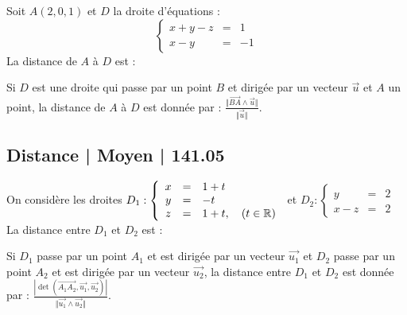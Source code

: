 \begin{question}
Soit $A(2,0,1)$ et $D$ la droite d'équations :
$$\left\{\begin{array}{ccl}x+y-z&=&1\\x-y&=&-1 \end{array}\right.$$
  La distance de $A$ à $D$ est : 
\begin{answers}


 
   
   
\end{answers}
\begin{explanations}
Si $D$ est une droite qui passe par un point $B$ et dirigée par un vecteur $\vec{u}$  et $A$ un point, la distance de $A$ à $D$ est donnée par : $\frac{ \Vert \overrightarrow{BA} \wedge \vec{u} \Vert}{\Vert \vec{u}  \Vert}$.
\end{explanations}

\end{question}

\subsection{Distance | Moyen | 141.05}


\begin{question} 
     
On considère les droites $D_1 : \left\{\begin{array}{ccl}x&=&1+t\\y&=&-t\\ z&=&1+t,\quad (t \in \mathbb{R})  \end{array}\right.$ et 
$D_2 : \left\{\begin{array}{ccl}y&=&2\\x-z&=&2 \end{array}\right.$
La distance entre $D_1$ et $D_2$ est :
\begin{answers}


 
    
  
\end{answers}
\begin{explanations}
Si $D_1$ passe par un point $A_1$ et est dirigée par un vecteur $\vec{u_1}$ et 
 $D_2$ passe par un point $A_2$ et est dirigée par un vecteur $\vec{u_2}$, la distance entre $D_1$ et $D_2$ est donnée par : $\frac{|\det(\overrightarrow{A_1A_2},\vec{u_1}, \vec{u_2})|}{\Vert \vec{u_1} \wedge \vec{u_2} \Vert }$.
\end{explanations}

\end{question}


